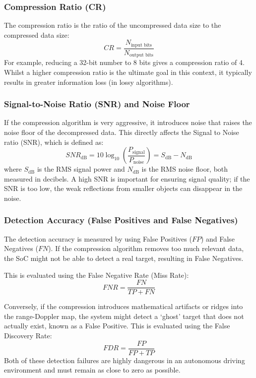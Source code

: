 \subsubsection{Compression Ratio (CR)}
The compression ratio is the ratio of the uncompressed data size to the compressed data size:
\begin{equation}
\label{eq:cr}
    CR = \frac{N_{\text{input bits}}}{N_{\text{output bits}}}
\end{equation}
For example, reducing a 32-bit number to 8 bits gives a compression ratio of 4. Whilst a higher compression ratio is the ultimate goal in this context, it typically results in greater information loss (in lossy algorithms).

\subsubsection{Signal-to-Noise Ratio (SNR) and Noise Floor}
If the compression algorithm is very aggressive, it introduces noise that raises the noise floor of the decompressed data. This directly affects the Signal to Noise ratio (SNR), which is defined as:
\begin{equation}
    SNR_{\text{dB}} = 10 \log_{10} \left( \frac{P_{\text{signal}}}{P_{\text{noise}}} \right) = S_{\text{dB}} - N_{\text{dB}}
\end{equation}
where $S_{\text{dB}}$ is the RMS signal power and $N_{\text{dB}}$ is the RMS noise floor, both measured in decibels. A high SNR is important for ensuring signal quality; if the SNR is too low, the weak reflections from smaller objects can disappear in the noise.

\subsubsection{Detection Accuracy (False Positives and False Negatives)}
The detection accuracy is measured by using False Positives ($FP$) and False Negatives ($FN$). If the compression algorithm removes too much relevant data, the SoC might not be able to detect a real target, resulting in False Negatives.

This is evaluated using the False Negative Rate (Miss Rate):
\begin{equation}
\label{eq:fnr}
    FNR = \frac{FN}{TP + FN}
\end{equation}

Conversely, if the compression introduces mathematical artifacts or ridges into the range-Doppler map, the system might detect a `ghost' target that does not actually exist, known as a False Positive. This is evaluated using the False Discovery Rate:
\begin{equation}
\label{eq:fdr}
    FDR = \frac{FP}{FP + TP}
\end{equation}
Both of these detection failures are highly dangerous in an autonomous driving environment and must remain as close to zero as possible.

